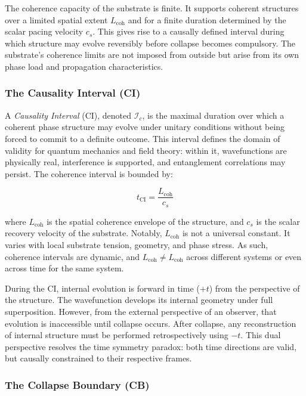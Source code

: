 \documentclass[entropy,article,submit,pdftex,moreauthors]{Definitions/mdpi}
\begin{document}
The coherence capacity of the substrate is finite. It supports coherent structures over a limited spatial extent \( L_{\text{coh}} \) and for a finite duration determined by the scalar pacing velocity \( c_s \). This gives rise to a causally defined interval during which structure may evolve reversibly before collapse becomes compulsory. The substrate’s coherence limits are not imposed from outside but arise from its own phase load and propagation characteristics.

\subsubsection{The Causality Interval (CI)}

A \textit{Causality Interval} (CI), denoted \( \mathcal{I}_c \), is the maximal duration over which a coherent phase structure may evolve under unitary conditions without being forced to commit to a definite outcome. This interval defines the domain of validity for quantum mechanics and field theory: within it, wavefunctions are physically real, interference is supported, and entanglement correlations may persist. The coherence interval is bounded by:

\[
t_{\text{CI}} = \frac{L_{\text{coh}}}{c_s}
\]

where \( L_{\text{coh}} \) is the spatial coherence envelope of the structure, and \( c_s \) is the scalar recovery velocity of the substrate. Notably, \( L_{\text{coh}} \) is not a universal constant. It varies with local substrate tension, geometry, and phase stress. As such, coherence intervals are dynamic, and \( L_{\text{coh}} \neq L_{\text{coh}} \) across different systems or even across time for the same system.

During the CI, internal evolution is forward in time (\( +t \)) from the perspective of the structure. The wavefunction develops its internal geometry under full superposition. However, from the external perspective of an observer, that evolution is inaccessible until collapse occurs. After collapse, any reconstruction of internal structure must be performed retrospectively using \( -t \). This dual perspective resolves the time symmetry paradox: both time directions are valid, but causally constrained to their respective frames.

\subsubsection{The Collapse Boundary (CB)}
\end{document}
